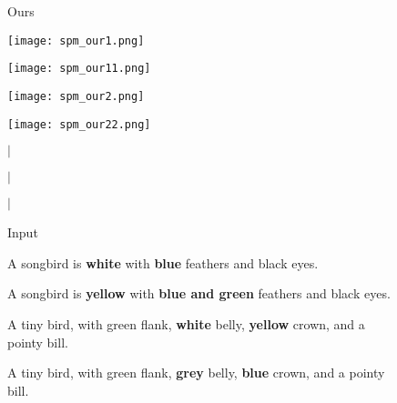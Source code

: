 \documentclass{article}
\begin{document}
\begin{figure}[t]
\begin{minipage}{0.48\textwidth}
\begin{minipage}{0.184\textwidth}
\centering
\tiny{Ours}
\end{minipage}
\begin{minipage}{0.184\textwidth}
\texttt{[image: spm\_our1.png]}
\end{minipage}
\noindent\begin{minipage}{0.184\textwidth}
\texttt{[image: spm\_our11.png]}
\end{minipage}
\noindent\begin{minipage}{0.184\textwidth}
\texttt{[image: spm\_our2.png]}
\end{minipage}
\noindent\begin{minipage}{0.184\textwidth}
\texttt{[image: spm\_our22.png]}
\end{minipage}
\end{minipage}
\begin{minipage}{0.01\textwidth}
\centering
$\Bigg\vert$

$\Bigg\vert$

$\Bigg\vert$
\end{minipage}
\begin{minipage}{0.48\textwidth}
\noindent\begin{minipage}{0.184\textwidth}
\centering
\tiny{Input}
\end{minipage}
\noindent\begin{minipage}{0.184\textwidth}
\centering
\tiny{A songbird is \textbf{white} with \textbf{blue} feathers and black eyes.}
\end{minipage}
\noindent\begin{minipage}{0.184\textwidth}
\centering
\tiny{A songbird is \textbf{yellow} with \textbf{blue and green} feathers and black eyes.}
\end{minipage}
\noindent\begin{minipage}{0.184\textwidth}
\centering
\tiny{A tiny bird, with green flank, \textbf{white} belly, \textbf{yellow} crown, and a pointy bill.}
\end{minipage}
\noindent\begin{minipage}{0.184\textwidth}
\centering
\tiny{A tiny bird, with green flank, \textbf{grey} belly, \textbf{blue} crown, and a pointy bill.}
\end{minipage}
\smallskip


\end{minipage}
\end{figure}
\end{document}
